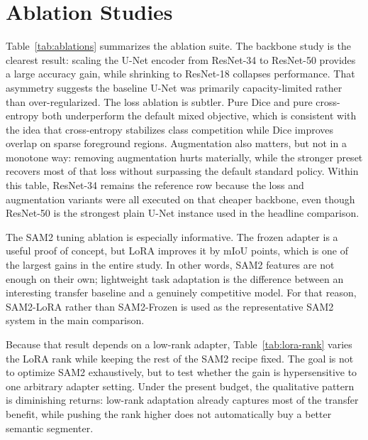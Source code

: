 \documentclass{article}
\begin{document}
\section{Ablation Studies}

Table~\ref{tab:ablations} summarizes the ablation suite. The backbone study is the clearest result: scaling the U-Net encoder from ResNet-34 to ResNet-50 provides a large accuracy gain, while shrinking to ResNet-18 collapses performance. That asymmetry suggests the baseline U-Net was primarily capacity-limited rather than over-regularized. The loss ablation is subtler. Pure Dice and pure cross-entropy both underperform the default mixed objective, which is consistent with the idea that cross-entropy stabilizes class competition while Dice improves overlap on sparse foreground regions. Augmentation also matters, but not in a monotone way: removing augmentation hurts materially, while the stronger preset recovers most of that loss without surpassing the default standard policy. Within this table, ResNet-34 remains the reference row because the loss and augmentation variants were all executed on that cheaper backbone, even though ResNet-50 is the strongest plain U-Net instance used in the headline comparison.

\begin{table}[H]
  \centering
  \caption{Official-validation ablation results. The delta column is measured relative to the default baseline within each group.}
  \label{tab:ablations}
  
\end{table}

The SAM2 tuning ablation is especially informative. The frozen adapter is a useful proof of concept, but LoRA improves it by \SamLoRAGain{} mIoU points, which is one of the largest gains in the entire study. In other words, SAM2 features are not enough on their own; lightweight task adaptation is the difference between an interesting transfer baseline and a genuinely competitive model. For that reason, SAM2-LoRA rather than SAM2-Frozen is used as the representative SAM2 system in the main comparison.

Because that result depends on a low-rank adapter, Table~\ref{tab:lora-rank} varies the LoRA rank while keeping the rest of the SAM2 recipe fixed. The goal is not to optimize SAM2 exhaustively, but to test whether the gain is hypersensitive to one arbitrary adapter setting. Under the present budget, the qualitative pattern is diminishing returns: low-rank adaptation already captures most of the transfer benefit, while pushing the rank higher does not automatically buy a better semantic segmenter.
\end{document}
